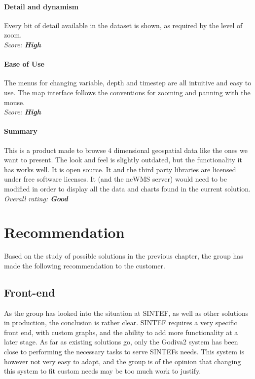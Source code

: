 \documentclass[11pt,a4paper,titlepage,oneside]{report}
\begin{document}
	\paragraph{Detail and dynamism}
	Every bit of detail available in the dataset is shown, as required by the level of zoom.
   \\ \emph{Score: \textbf{High}}
	
	\paragraph{Ease of Use}
	The menus for changing variable, depth and timestep are all intuitive and easy to use. The map interface follows the conventions for zooming and panning with the mouse.
   \\ \emph{Score: \textbf{High}}
	
	\paragraph{Summary}
	This is a product made to browse 4 dimensional geospatial data like the ones we want to present. The look and feel is slightly outdated, but the functionality it has works well. It is open source. It and the third party libraries are licensed under free software licenses. It (and the ncWMS server) would need to be modified in order to display all the data and charts found in the current solution.
   \\ \emph{Overall rating: \textbf{Good}}
	

\section{Recommendation}
Based on the study of possible solutions in the previous chapter, the group has made the following recommendation to the customer.

\subsection{Front-end}
As the group has looked into the situation at SINTEF, as well as other solutions in production, the conclusion is rather clear. SINTEF requires a very specific front end, with custom graphs, and the ability to add more functionality at a later stage. As far as existing solutions go, only the Godiva2 system has been close to performing the necessary tasks to serve SINTEFs needs. This system is however not very easy to adapt, and the group is of the opinion that changing this system to fit custom needs may be too much work to justify.
\end{document}
